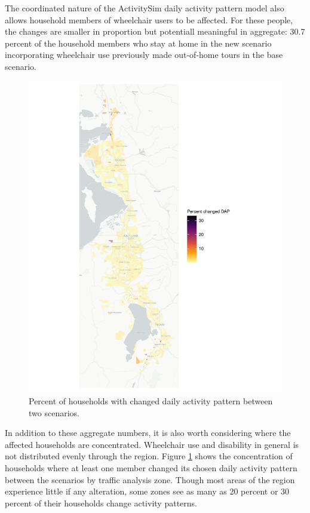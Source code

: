 \documentclass[3p, authoryear, review]{elsarticle} %
\begin{document}
The coordinated nature of the ActivitySim daily activity pattern model also allows
household members of wheelchair users to be affected. For these people,
the changes are smaller in proportion but potentiall meaningful in aggregate:
30.7 percent of the household members who stay at home in the new scenario
incorporating wheelchair use previously made out-of-home tours in the base scenario.

\begin{figure}
\centering
\includegraphics{wheelchair_cdap_files/figure-latex/dap-map-1.pdf}
\caption{\label{fig:dap-map}Percent of households with changed daily activity pattern between two scenarios.}
\end{figure}

In addition to these aggregate numbers, it is also worth considering where the
affected households are concentrated. Wheelchair use and disability in general
is not distributed evenly through the region. Figure \ref{fig:dap-map} shows the
concentration of households where at least one member changed its chosen
daily activity pattern between the scenarios by traffic analysis zone. Though
most areas of the region experience little if any alteration, some zones see as
many as 20 percent or 30 percent of their households change activity patterns.
\end{document}
